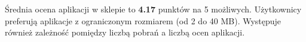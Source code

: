 \documentclass{article}
\begin{document}
Średnia ocena aplikacji w sklepie to \textbf{4.17} punktów na 5 możliwych. Użytkownicy preferują aplikacje z ograniczonym rozmiarem (od 2 do 40 MB). Występuje również zależność pomiędzy liczbą pobrań a liczbą ocen aplikacji.

\clearpage



\end{document}

